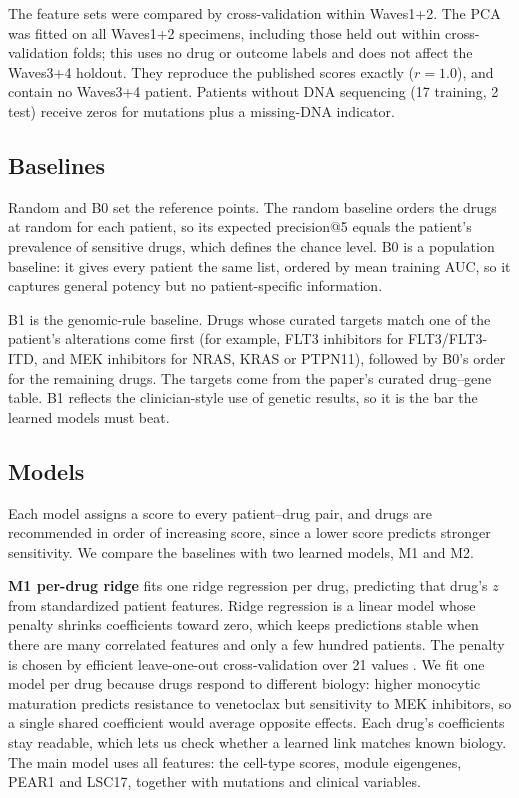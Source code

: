 \documentclass[11pt,logo,nonumbering]{preprint}
\newcommand{\z}{z}
\begin{document}
The feature sets were compared by cross-validation within Waves1+2. The PCA was fitted on all Waves1+2 specimens, including those held out within cross-validation folds; this uses no drug or outcome labels and does not affect the Waves3+4 holdout. They reproduce the published scores exactly ($r=1.0$), and contain no Waves3+4 patient. Patients without DNA sequencing (17 training, 2 test) receive zeros for mutations plus a missing-DNA indicator.

\subsection{Baselines}
Random and B0 set the reference points. The random baseline orders the drugs at random for each patient, so its expected precision@5 equals the patient's prevalence of sensitive drugs, which defines the chance level. B0 is a population baseline: it gives every patient the same list, ordered by mean training AUC, so it captures general potency but no patient-specific information.

B1 is the genomic-rule baseline. Drugs whose curated targets match one of the patient's alterations come first (for example, FLT3 inhibitors for FLT3/FLT3-ITD, and MEK inhibitors for NRAS, KRAS or PTPN11), followed by B0's order for the remaining drugs. The targets come from the paper's curated drug--gene table. B1 reflects the clinician-style use of genetic results, so it is the bar the learned models must beat.

\subsection{Models}
Each model assigns a score to every patient–drug pair, and drugs are recommended in order of increasing score, since a lower score predicts stronger sensitivity. We compare the baselines with two learned models, M1 and M2.

\textbf{M1 per-drug ridge} fits one ridge regression per drug, predicting that drug's $\z$ from standardized patient features. Ridge regression is a linear model whose penalty shrinks coefficients toward zero, which keeps predictions stable when there are many correlated features and only a few hundred patients. The penalty is chosen by efficient leave-one-out cross-validation over 21 values \citep{pedregosa2011sklearn}. We fit one model per drug because drugs respond to different biology: higher monocytic maturation predicts resistance to venetoclax but sensitivity to MEK inhibitors, so a single shared coefficient would average opposite effects. Each drug's coefficients stay readable, which lets us check whether a learned link matches known biology. The main model uses all features: the cell-type scores, module eigengenes, PEAR1 and LSC17, together with mutations and clinical variables.
\end{document}
